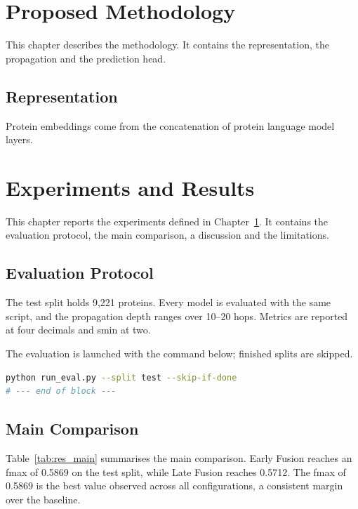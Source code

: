 \chapter{Proposed Methodology}\label{cap:metodologia}

This chapter describes the methodology. It contains the representation, the propagation and the prediction head.

\section{Representation}\label{sec:met_representacao}

Protein embeddings come from the concatenation of protein language model layers.

\chapter{Experiments and Results}\label{cap:resultados}

This chapter reports the experiments defined in Chapter~\ref{cap:metodologia}. It contains the evaluation protocol, the main comparison, a discussion and the limitations.

\section{Evaluation Protocol}\label{sec:res_protocolo}

The test split holds 9,221 proteins. Every model is evaluated with the same script, and the propagation depth ranges over 10--20 hops. Metrics are reported at four decimals and smin at two.

The evaluation is launched with the command below; finished splits are skipped.

\begin{lstlisting}[language=bash]
python run_eval.py --split test --skip-if-done
# --- end of block ---
\end{lstlisting}

\section{Main Comparison}\label{sec:res_comparacao}

Table~\ref{tab:res_main} summarises the main comparison. Early Fusion reaches an fmax of 0.5869 on the test split, while Late Fusion reaches 0.5712.
The fmax of 0.5869 is the best value observed across all configurations, a consistent margin over the baseline.

